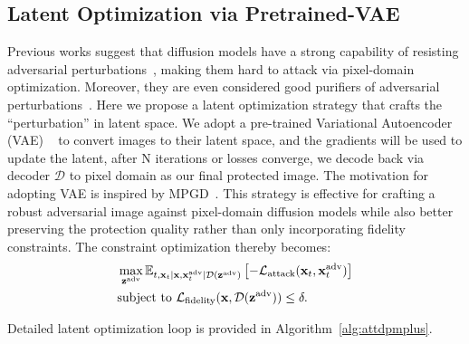 \subsection{Latent Optimization via Pretrained-VAE}
Previous works suggest that diffusion models have a strong capability of resisting adversarial perturbations~\cite{xue2024pixelbarrierdiffusionmodels}, making them hard to attack via pixel-domain optimization. Moreover, they are even considered good purifiers of adversarial perturbations~\cite{nie2022diffusionmodelsadversarialpurification}. Here we propose a latent optimization strategy that crafts the ``perturbation'' in latent space. We adopt a pre-trained Variational Autoencoder (VAE) ~\cite{kingma2014autoencoding} to convert images to their latent space, and the gradients will be used to update the latent, after N iterations or losses converge, we decode back via decoder $\mathcal{D}$ to pixel domain as our final protected image. The motivation for adopting VAE is inspired by MPGD~\cite{he2024manifold}. This strategy is effective for crafting a robust adversarial image against pixel-domain diffusion models while also better preserving the protection quality rather than only incorporating fidelity constraints. The constraint optimization thereby becomes: 
\begin{equation}
\begin{aligned}
    & \max_{\mathbf{z}^{\adv}}
    \mathbb{E}_{
    t,
    \mathbf{x}_t| \mathbf{x}, \mathbf{x}_t^{\adv}| \mathcal{D}(\mathbf{z}^{\adv})}
    \left[-\mathcal{L}_\text{attack}(\mathbf{x}_t, \mathbf{x}_t^{\adv})\right] \\
    & \text{subject to } \mathcal{L}_\text{fidelity}(\mathbf{x}, \mathcal{D}(\mathbf{z}^{\adv})) \leq \delta.
\end{aligned}
\label{eq:probelm_setting_constraint}
\end{equation}

\noindent Detailed latent optimization loop is provided in Algorithm~\ref{alg:attdpmplus}.


